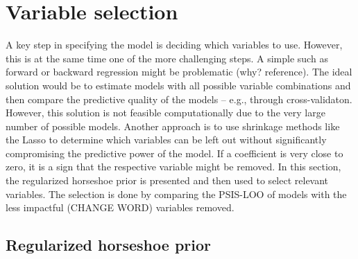 \section{Variable selection}
\label{ch:varsel}
A key step in specifying the model is deciding which variables to use.
However, this is at the same time one of the more challenging steps.
A simple such as forward or backward regression might be problematic (why? reference).
The ideal solution would be to estimate models with all possible variable combinations and then compare the predictive quality of the models – e.g., through cross-validaton.
However, this solution is not feasible computationally due to the very large number of possible models.
Another approach is to use shrinkage methods like the Lasso \citep{tibshirani_regression_1996} to determine which variables can be left out without significantly compromising the predictive power of the model.
If a coefficient is very close to zero, it is a sign that the respective variable might be removed.
In this section, the regularized horseshoe prior \citep{piironen_sparsity_2017} is presented and then used to select relevant variables. The selection is done by comparing the PSIS-LOO of models with the less impactful (CHANGE WORD) variables removed.

\subsection{Regularized horseshoe prior}

